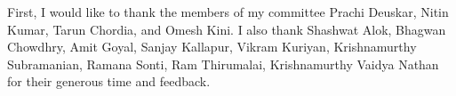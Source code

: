 First, I would like to thank the members of my committee Prachi Deuskar, Nitin Kumar, Tarun Chordia, and Omesh Kini. I also thank Shashwat Alok, Bhagwan Chowdhry, Amit Goyal, Sanjay Kallapur, Vikram Kuriyan, Krishnamurthy Subramanian, Ramana Sonti, Ram Thirumalai, Krishnamurthy Vaidya Nathan for their generous time and feedback.